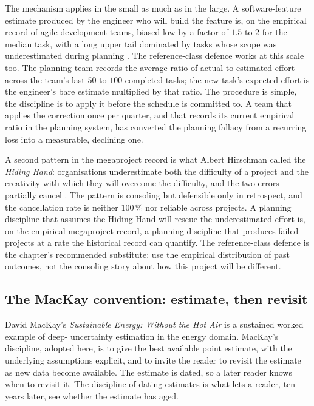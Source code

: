The mechanism applies in the small as much as in the large. A
software-feature estimate produced by the engineer who will build
the feature is, on the empirical record of agile-development
teams, biased low by a factor of $1.5$ to $2$ for the median task,
with a long upper tail dominated by tasks whose scope was
underestimated during planning
\cite{ch09-paper:bent-2018-overruns}. The reference-class defence
works at this scale too. The planning team records the average
ratio of actual to estimated effort across the team's last $50$
to $100$ completed tasks; the new task's expected effort is the
engineer's bare estimate multiplied by that ratio. The procedure
is simple, the discipline is to apply it before the schedule is
committed to. A team that applies the correction once per
quarter, and that records its current empirical ratio in the
planning system, has converted the planning fallacy from a
recurring loss into a measurable, declining one.

A second pattern in the megaproject record is what Albert
Hirschman called the \emph{Hiding Hand}: organisations
underestimate both the difficulty of a project and the
creativity with which they will overcome the difficulty, and the
two errors partially cancel
\cite{ch09-paper:bent-2018-overruns}. The pattern is consoling
but defensible only in retrospect, and the cancellation rate is
neither $100\,\%$ nor reliable across projects. A planning
discipline that assumes the Hiding Hand will rescue the
underestimated effort is, on the empirical megaproject record, a
planning discipline that produces failed projects at a rate the
historical record can quantify. The reference-class defence is
the chapter's recommended substitute: use the empirical
distribution of past outcomes, not the consoling story about how
this project will be different.

\subsection{The MacKay convention: estimate, then revisit}

David MacKay's \emph{Sustainable Energy: Without the Hot Air}
\cite{gen:mackay2009} is a sustained worked example of deep-
uncertainty estimation in the energy domain. MacKay's discipline,
adopted here, is to give the best available point estimate, with
the underlying assumptions explicit, and to invite the reader to
revisit the estimate as new data become available. The estimate is
dated, so a later reader knows when to revisit it. The discipline of
dating estimates is what lets a reader, ten years later, see whether
the estimate has aged.


